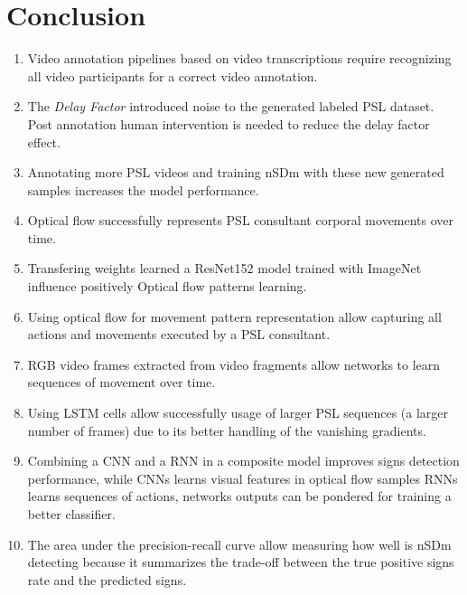 \documentclass[twocolumn,conference]{article}
\begin{document}
\begin{enumerate}[•]
\end{enumerate}

\section{Conclusion}\label{conclusion}
\begin{enumerate}[•]
\item Video annotation pipelines based on video transcriptions require recognizing all video participants for a correct video annotation.
\item The \textit{Delay Factor} introduced noise to the generated labeled PSL dataset. Post annotation human intervention is needed to reduce the delay factor effect.
\item Annotating more PSL videos and training nSDm with these new generated samples increases the model performance.
\item Optical flow successfully represents PSL consultant corporal movements over time.
\item Transfering weights learned a ResNet152 model trained with ImageNet influence positively Optical flow patterns learning.
\item Using optical flow for movement pattern representation allow capturing all actions and movements executed by a PSL consultant.
\item RGB video frames extracted from video fragments allow networks to learn sequences of movement over time.
\item Using LSTM cells allow successfully usage of larger PSL sequences (a larger number of frames) due to its better handling of the vanishing gradients.
\item Combining a CNN and a RNN in a composite model improves signs detection performance, while CNNs learns visual features in optical flow samples RNNs learns sequences of actions, networks outputs can be pondered for training a better classifier.
\item The area under the precision-recall curve allow measuring how well is nSDm detecting because it summarizes the trade-off between the true positive signs rate and the predicted signs.
\end{enumerate}



\end{document}
